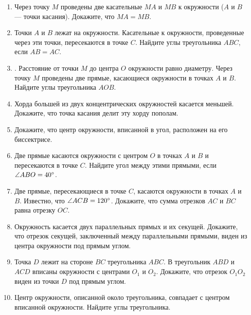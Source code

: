 \documentclass[12pt, a4paper]{article}
\begin{document}
	
	\begin{enumerate}
		\item \textit{} Через точку $M$ проведены две касательные $MA$ и $MB$ к окружности ($A$ и $B$ — точки касания). Докажите,
		что $MA = MB$.
		\item \textit{} Точки $A$ и $B$ лежат на окружности. Касательные к окружности, проведенные через эти точки, пересекаются в точке $C$. Найдите углы треугольника $ABC$, если $AB = AC$.
		\item \textit{} . Расстояние от точки $M$ до центра $O$ окружности равно диаметру. Через точку $M$ проведены две прямые, касающиеся окружности в точках $A$ и $B$. Найдите углы треугольника $AOB$.
		\item \textit{} Хорда большей из двух концентрических окружностей касается меньшей. Докажите, что точка касания делит эту хорду пополам.
		
		\item \textit{} Докажите, что центр окружности, вписанной в угол, расположен на его биссектрисе.
		
		\item \textit{} Две прямые касаются окружности с центром $O$ в точках $A$ и $B$ и пересекаются в точке $C$. Найдите угол между этими
		прямыми, если $\angle ABO = 40 \degree$.
		\item \textit{} Две прямые, пересекающиеся в точке $C$, касаются окружности в точках $A$ и $B$. Известно, что $\angle ACB = 120 \degree$. Докажите, что сумма отрезков $AC$ и $BC$ равна отрезку $OC$.
		\item \textit{} Окружность касается двух параллельных прямых и
		их секущей. Докажите, что отрезок секущей, заключенный между параллельными прямыми, виден из центра окружности под
		прямым углом.
		\item \textit{} Точка $D$ лежит на стороне $BC$ треугольника $ABC$. В треугольник $ABD$ и $ACD$ вписаны окружности с центрами $O_1$ и $O_2$. Докажите, что отрезок $O_1O_2$ виден из точки $D$ под прямым углом.
		\item \textit{} Центр окружности, описанной около треугольника,	совпадает с центром вписанной окружности. Найдите углы треугольника.
	\end{enumerate}
\end{document}
